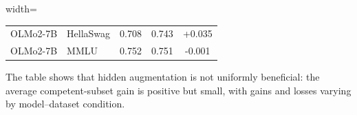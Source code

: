 \begin{table}[t]
\begin{threeparttable}
\begin{adjustbox}{width=\textwidth}
\begin{tabular}{llccc}
OLMo2-7B & HellaSwag & 0.708 & 0.743 & +0.035 \\
OLMo2-7B & MMLU & 0.752 & 0.751 & -0.001 \\
\bottomrule
\end{tabular}
\end{adjustbox}
\begin{tablenotes}[flushleft]\footnotesize\item The table shows that hidden augmentation is not uniformly beneficial: the average competent-subset gain is positive but small, with gains and losses varying by model--dataset condition.\end{tablenotes}
\end{threeparttable}
\end{table}
